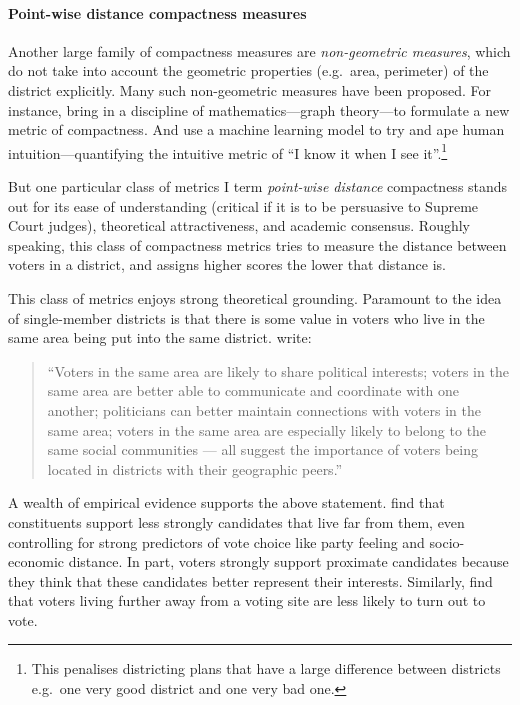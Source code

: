 \documentclass[]{article}
\let\oldparagraph\paragraph
\renewcommand{\paragraph}[1]{\oldparagraph{#1}\mbox{}}
\begin{document}
\hypertarget{point-wise-distance-compactness-measures}{%
\paragraph{Point-wise distance compactness
measures}\label{point-wise-distance-compactness-measures}}

Another large family of compactness measures are \emph{non-geometric
measures}, which do not take into account the geometric properties
(e.g.~area, perimeter) of the district explicitly. Many such
non-geometric measures have been proposed. For instance, \cite{dc2016}
bring in a discipline of mathematics---graph theory---to formulate a new
metric of compactness. And \cite{kingwp} use a machine learning model to
try and ape human intuition---quantifying the intuitive metric of ``I
know it when I see it''.\footnote{This penalises districting plans that
  have a large difference between districts e.g.~one very good district
  and one very bad one.}

But one particular class of metrics I term \emph{point-wise distance}
compactness stands out for its ease of understanding (critical if it is
to be persuasive to Supreme Court judges), theoretical attractiveness,
and academic consensus. Roughly speaking, this class of compactness
metrics tries to measure the distance between voters in a district, and
assigns higher scores the lower that distance is.

This class of metrics enjoys strong theoretical grounding. Paramount to
the idea of single-member districts is that there is some value in
voters who live in the same area being put into the same district.
\cite{er2019} write:

\begin{quote}
``Voters in the same area are likely to share political interests;
voters in the same area are better able to communicate and coordinate
with one another; politicians can better maintain connections with
voters in the same area; voters in the same area are especially likely
to belong to the same social communities --- all suggest the importance
of voters being located in districts with their geographic peers.''
\end{quote}

A wealth of empirical evidence supports the above statement.
\cite{arzheimer2012} find that constituents support less strongly
candidates that live far from them, even controlling for strong
predictors of vote choice like party feeling and socio-economic
distance. In part, voters strongly support proximate candidates because
they think that these candidates better represent their interests.
Similarly, \cite{dyck2005} find that voters living further away from a
voting site are less likely to turn out to vote.
\end{document}
